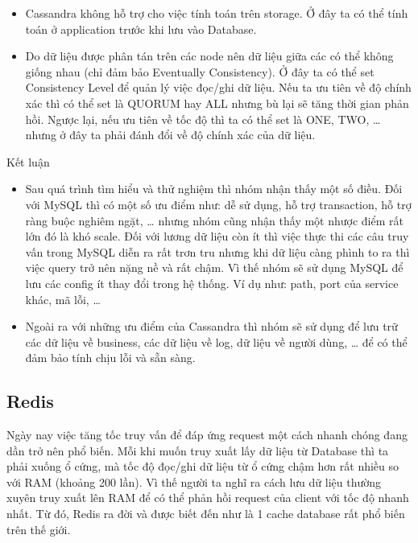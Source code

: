 \begin{itemize}
            \begin{itemize}
                \item Cassandra không hỗ trợ cho việc tính toán trên storage. Ở đây ta có thể tính toán ở application trước khi lưu vào Database.
                \item Do dữ liệu được phân tán trên các node nên dữ liệu giữa các có thể không giống nhau (chỉ đảm bảo Eventually Consistency). Ở đây ta có thể set Consistency Level để quản lý việc đọc/ghi dữ liệu. Nếu ta ưu tiên về độ chính xác thì có thể set là QUORUM hay ALL nhưng bù lại sẽ tăng thời gian phản hồi. Ngược lại, nếu ưu tiên về tốc độ thì ta có thể set là ONE, TWO, … nhưng ở đây ta phải đánh đổi về độ chính xác của dữ liệu.
            \end{itemize}
            
            Kết luận
            
            \begin{itemize}
                \item Sau quá trình tìm hiểu và thử nghiệm thì nhóm nhận thấy một số điều. Đối với MySQL thì có một số ưu điểm như: dễ sử dụng, hỗ trợ transaction, hỗ trợ ràng buộc nghiêm ngặt, … nhưng nhóm cũng nhận thấy một nhược điểm rất lớn đó là khó scale. Đối với lương dữ liệu còn ít thì việc thực thi các câu truy vấn trong MySQL diễn ra rất trơn tru nhưng khi dữ liệu càng phình to ra thì việc query trở nên nặng nề và rất chậm. Vì thế nhóm sẽ sử dụng MySQL để lưu các config ít thay đổi trong hệ thống. Ví dụ như: path, port của service khác, mã lỗi, …
                \item Ngoài ra với những ưu điểm của Cassandra thì nhóm sẽ sử dụng để lưu trữ các dữ liệu về business, các dữ liệu về log, dữ liệu về người dùng, … để có thể đảm bảo tính chịu lỗi và sẵn sàng.
            \end{itemize}
            \subsection{Redis}
            
            Ngày nay việc tăng tốc truy vấn để đáp ứng request một cách nhanh chóng đang dần trở nên phổ biến. Mỗi khi muốn truy xuất lấy dữ liệu từ Database thì ta phải xuống ổ cứng, mà tốc độ đọc/ghi dữ liệu từ ổ cứng chậm hơn rất nhiều so với RAM (khoảng 200 lần). Vì thế người ta nghĩ ra cách lưu dữ liệu thường xuyên truy xuất lên RAM để có thể phản hồi request của client với tốc độ nhanh nhất. Từ đó, Redis ra đời và được biết đến như là 1 cache database rất phổ biến trên thế giới.
            

\end{itemize}
